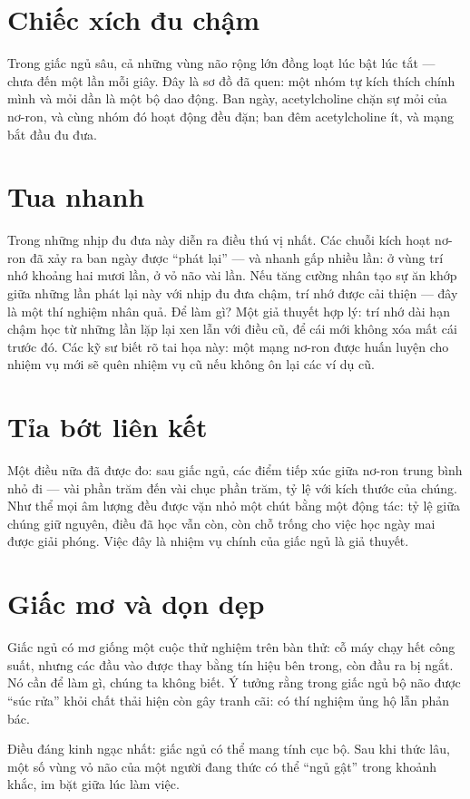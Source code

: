 \section*{Chiếc xích đu chậm}

Trong giấc ngủ sâu, cả những vùng não rộng lớn đồng loạt lúc bật lúc tắt --- chưa đến một lần mỗi giây. Đây là sơ đồ đã quen: một nhóm tự kích thích chính mình và mỏi dần là một bộ dao động. Ban ngày, acetylcholine chặn sự mỏi của nơ-ron, và cùng nhóm đó hoạt động đều đặn; ban đêm acetylcholine ít, và mạng bắt đầu đu đưa.


\section*{Tua nhanh}

Trong những nhịp đu đưa này diễn ra điều thú vị nhất. Các chuỗi kích hoạt nơ-ron đã xảy ra ban ngày được ``phát lại'' --- và nhanh gấp nhiều lần: ở vùng trí nhớ khoảng hai mươi lần, ở vỏ não vài lần. Nếu tăng cường nhân tạo sự ăn khớp giữa những lần phát lại này với nhịp đu đưa chậm, trí nhớ được cải thiện --- đây là một thí nghiệm nhân quả. Để làm gì? Một giả thuyết hợp lý: trí nhớ dài hạn chậm học từ những lần lặp lại xen lẫn với điều cũ, để cái mới không xóa mất cái trước đó. Các kỹ sư biết rõ tai họa này: một mạng nơ-ron được huấn luyện cho nhiệm vụ mới sẽ quên nhiệm vụ cũ nếu không ôn lại các ví dụ cũ.

\section*{Tỉa bớt liên kết}

Một điều nữa đã được đo: sau giấc ngủ, các điểm tiếp xúc giữa nơ-ron trung bình nhỏ đi --- vài phần trăm đến vài chục phần trăm, tỷ lệ với kích thước của chúng. Như thể mọi âm lượng đều được vặn nhỏ một chút bằng một động tác: tỷ lệ giữa chúng giữ nguyên, điều đã học vẫn còn, còn chỗ trống cho việc học ngày mai được giải phóng. Việc đây là nhiệm vụ chính của giấc ngủ là giả thuyết.

\section*{Giấc mơ và dọn dẹp}

Giấc ngủ có mơ giống một cuộc thử nghiệm trên bàn thử: cỗ máy chạy hết công suất, nhưng các đầu vào được thay bằng tín hiệu bên trong, còn đầu ra bị ngắt. Nó cần để làm gì, chúng ta không biết. Ý tưởng rằng trong giấc ngủ bộ não được ``súc rửa'' khỏi chất thải hiện còn gây tranh cãi: có thí nghiệm ủng hộ lẫn phản bác.

Điều đáng kinh ngạc nhất: giấc ngủ có thể mang tính cục bộ. Sau khi thức lâu, một số vùng vỏ não của một người đang thức có thể ``ngủ gật'' trong khoảnh khắc, im bặt giữa lúc làm việc.

